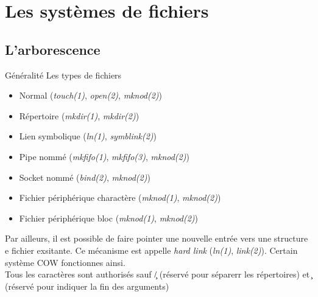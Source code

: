 %
%
%

\section{Les systèmes de fichiers}

\subsection{L'arborescence}

\begin{frame}[fragile=singleslide]{Généralité}
  Les types de fichiers
  \begin{itemize}
  \item Normal (\emph{touch(1)}, \emph{open(2)}, \emph{mknod(2)})
  \item Répertoire (\emph{mkdir(1)}, \emph{mkdir(2)})
  \item Lien symbolique (\emph{ln(1)}, \emph{symblink(2)})
  \item Pipe nommé (\emph{mkfifo(1)}, \emph{mkfifo(3)}, \emph{mknod(2)})
  \item Socket nommé (\emph{bind(2)}, \emph{mknod(2)})
  \item Fichier périphérique charactère (\emph{mknod(1)}, \emph{mknod(2)})
  \item Fichier périphérique bloc (\emph{mknod(1)}, \emph{mknod(2)})
  \end{itemize}

  Par ailleurs, il  est possible de faire pointer  une nouvelle entrée
  vers  une structure e  fichier exsitante.  Ce mécanisme  est appelle
  \emph{hard link} (\emph{ln(1)}, \emph{link(2)}). Certain système COW
  fonctionnes ainsi.
  \\
  Tous  les  caractères  sont  authorisés  sauf  \c{/}  (réservé  pour
  séparerr les  répertoires) et \c{\0}  (réservé pour indiquer  la fin
  des arguments)
\end{frame}

